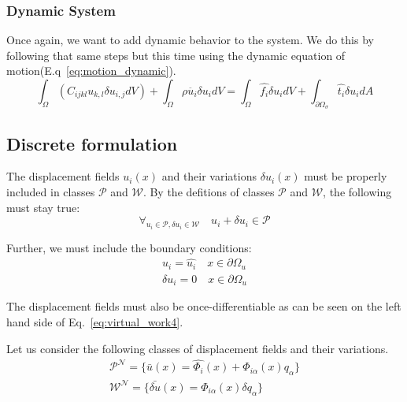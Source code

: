 \documentclass[en]{minipw} %
\begin{document}
\subsubsection{Dynamic System}
Once again, we want to add dynamic behavior to the system. We do this by following that same steps but this time using the dynamic equation of motion(E.q~\ref{eq:motion_dynamic}).
\begin{equation}
\label{eq:virtual_work_dynamic4}
\int_{\Omega}(C_{ijkl} u_{k,l} \delta u_{i,j} dV ) + \int_{\Omega}\rho \ddot{u_i} \delta u_i dV = \int_{\Omega} \hat{f_i} \delta u_{i} dV + \int_{\partial \Omega_{\sigma}} \hat{t_i} \delta u_{i} dA
\end{equation}

\subsection{Discrete formulation}


The displacement fields $u_{i}(x)$ and their variations $\delta u_{i}(x)$ must be properly included in classes $\mathcal{P}$ and $\mathcal{W}$. By the defitions of classes $\mathcal{P}$ and $\mathcal{W}$, the following must stay true:
\begin{equation}
\forall_{u_{i} \in \mathcal{P}, \delta u_{i} \in \mathcal{W}} \quad u_i + \delta u_i \in \mathcal{P}
\end{equation}

Further, we must include the boundary conditions:
\begin{equation}
\begin{aligned}
u_i = \hat{u_i} \quad x \in \partial  \Omega_{u}
\\
\delta u_i = 0 \quad x \in \partial  \Omega_{u}
\end{aligned}
\end{equation}

The displacement fields must also be once-differentiable as can be seen on the left hand side of Eq.~\ref{eq:virtual_work4}.

Let us consider the following classes of displacement fields and their variations.
\begin{equation}
\begin{aligned}
\mathcal{P^{N}} = \{\bar{u}(x) = \hat{\Phi_i}(x) + \Phi_{i \alpha}(x)q_{\alpha} \}
\\
\mathcal{W^{N}} = \{\bar{\delta u}(x) = \Phi_{i \alpha}(x) \delta q_{\alpha} \}
\end{aligned}
\end{equation}
\end{document}
